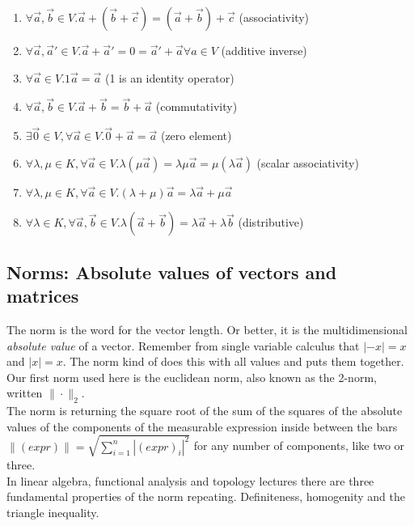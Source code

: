 \documentclass[a4paper]{article}
\begin{document}
\begin{Example}
\begin{enumerate}
\label{kvs_axioms}
\item $\forall \vec{a},\vec{b} \in V. \vec{a}+(\vec{b}+\vec{c}) = (\vec{a}+\vec{b})+\vec{c}$ (associativity)
\item $\forall \vec{a},\vec{a}' \in V. \vec{a} + \vec{a}' = 0 = \vec{a}' + \vec{a} \forall a \in V$ (additive inverse)
\item $\forall \vec{a} \in V. 1\vec{a} = \vec{a}$    (1 is an identity operator)
\item $\forall \vec{a},\vec{b} \in V.  \vec{a}+\vec{b}=\vec{b}+\vec{a}$ (commutativity)
\item $\exists \vec{0} \in V,\forall \vec{a} \in V. \vec{0}+\vec{a}=\vec{a}$ (zero element)
\item $\forall \lambda,\mu \in K, \forall \vec{a} \in V. \lambda(\mu\vec{a})=\lambda\mu\vec{a}=\mu(\lambda\vec{a})$ (scalar associativity)
\item $\forall \lambda,\mu \in K, \forall \vec{a} \in V. (\lambda + \mu)\vec{a} = \lambda\vec{a}+\mu\vec{a}$
\item $\forall \lambda \in K, \forall \vec{a}, \vec{b} \in V. \lambda(\vec{a}+\vec{b}) = \lambda\vec{a}+\lambda\vec{b}$  (distributive)
\end{enumerate}

\subsection{Norms: Absolute values of vectors and matrices}



The norm is the word for the vector length. Or better, it is the multidimensional \emph{absolute value} of a vector. Remember from single variable calculus that $|-x|=x$ and $|x|=x$. The norm kind of does this with all values and puts them together.
Our first norm used here is the euclidean norm, also known as the 2-norm, written $\|\cdot\|_{2}$. \\

 The norm is returning  the square root of the sum of the squares of the absolute values of the components of the measurable expression inside between the bars $\|(expr)\| = \sqrt{\sum_{i=1}^{n}|(expr)_{i}|^2}$ for any number of components, like two or three.\\

In linear algebra, functional analysis and topology lectures there are three fundamental properties of the norm repeating. Definiteness, homogenity and the triangle inequality. 


\end{Example}
\end{document}
